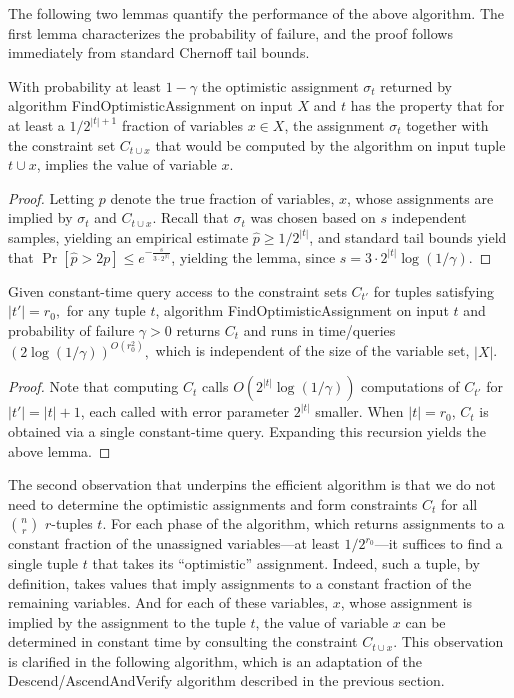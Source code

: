 \documentclass[final,12pt]{colt2018}
\begin{document}
The following two lemmas quantify the performance of the above algorithm.  The first lemma characterizes the probability of failure, and the proof follows immediately from standard Chernoff tail bounds.
\begin{lemma}
With probability at least $1-\gamma$  the optimistic assignment $\sigma_t$ returned by  algorithm FindOptimisticAssignment on input $X$ and $t$ has the property that for at least a $1/2^{|t|+1}$ fraction of variables $x \in X$, the assignment $\sigma_t$ together with the constraint set $C_{t \cup x}$ that would be computed by the algorithm on input tuple $t \cup x$, implies the value of variable $x$.  
\end{lemma}
\begin{proof}
Letting $p$ denote the true fraction of variables, $x$, whose assignments are implied by $\sigma_t$ and $C_{t \cup x}$.  Recall that $\sigma_t$ was chosen based on $s$ independent samples, yielding an empirical estimate $\hat{p} \ge 1/2^{|t|}$, and standard tail bounds yield that $\Pr[\hat{p} > 2p] \le e^{-\frac{s}{3\cdot 2^{|t|}}}$, yielding the lemma, since $s=3\cdot 2^{|t|} \log (1/\gamma)$.
\end{proof}

\begin{lemma}
Given constant-time query access to the constraint sets $C_{t'}$ for tuples satisfying $|t'|=r_0,$ for any tuple $t$, algorithm FindOptimisticAssignment on input $t$ and probability of failure $\gamma>0$ returns $C_t$ and runs in time/queries $\left(2\log(1/\gamma)\right)^{O(r_0^2)},$ which is independent of the size of the variable set, $|X|$.
\end{lemma}
\begin{proof}
Note that computing $C_t$ calls $O(2^{|t|} \log (1/\gamma))$ computations of $C_{t'}$ for $|t'| = |t|+1$, each called with error parameter $2^{|t|}$ smaller.  When $|t|=r_0$, $C_t$ is obtained via a single constant-time query.  Expanding this recursion yields the above lemma.
\end{proof}

The second observation that underpins the efficient algorithm is that we do not need to determine the optimistic assignments and form constraints $C_t$ for all ${n \choose r}$ $r$-tuples $t$.  For each phase of the algorithm, which returns assignments to a constant fraction of the unassigned variables---at least $1/2^{r_0}$---it suffices to find a single tuple $t$ that takes its ``optimistic'' assignment.  Indeed, such a tuple, by definition, takes values that imply assignments to a constant fraction of the remaining variables.  And for each of these variables, $x$, whose assignment is implied by the assignment to the tuple $t$, the value of variable $x$ can be determined in constant time by consulting the constraint $C_{t \cup x}.$  This observation is clarified in the following algorithm, which is an adaptation of the Descend/AscendAndVerify algorithm described in the previous section.   
\end{document}
